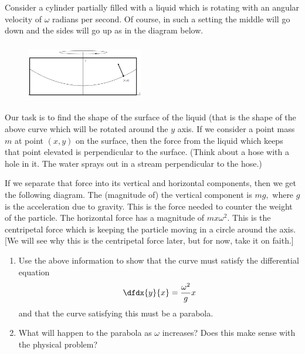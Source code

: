 \begin{embeddedproblem}{}
  Consider a cylinder partially filled with a liquid which is rotating
  with an angular velocity of $\omega$ radians per second.  Of course, in
  such a setting the middle will go down and the sides will go up as
  in the diagram below.
\begin{figure}
\captionsetup{labelformat=empty}
\centerline{\includegraphics*[height=1in,width=2in]{Figures/SpinCasting3}}
\label{fig:}
\end{figure}
\end{embeddedproblem}
Our task is to find the shape of the surface of the liquid (that is
the shape of the above curve which will be rotated around the $y$ axis.
If we consider a point mass $m$ at point $(x,y)$ on the surface, then the
force from the liquid which keeps that point elevated is perpendicular
to the surface.  (Think about a hose with a hole in it.  The water
sprays out in a stream perpendicular to the hose.)   


If we separate that force into its vertical and horizontal components,
then we get the following diagram.  
The (magnitude of) the vertical component is $mg,$ where $g$ is the
acceleration due to gravity.  This is the force needed to counter the
weight of the particle.  The horizontal force has a magnitude of
$mx\omega^2.$ This is the centripetal force which is keeping the
particle moving in a circle around the axis.  [We will see why this is
the centripetal force later, but for now, take it on faith.]
    \begin{enumerate}[label={\bf{}(\alph*)}]
    \item Use the above information to show that the curve must
      satisfy the differential equation
      $$
      \dfdx{y}{x}=\frac{\omega^2}{g} x
      $$
      and that the curve satisfying this must be a parabola.
    \item What will happen to the parabola as $\omega$ increases?  Does this
      make sense with the physical problem?
    \end{enumerate}
    
